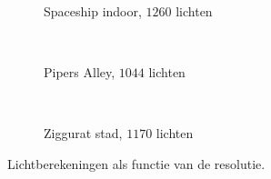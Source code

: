 \begin{figure}[t]
\begin{subfigure}[b]{\textwidth}
  \end{subfigure}\hfill\\
  \begin{minipage}[t]{0.5\textwidth}
  \begin{adjustbox}{minipage=\textwidth, scale=0.55}
    \begin{subfigure}[b]{1.6\textwidth}
      \centering
      \def\svgwidth{\textwidth}
      
      \caption{Spaceship indoor, $1260$ lichten}
      \vspace{4pt}
      \label{fig:ts-lc-resolution:indoor}
    \end{subfigure}
  \end{adjustbox} \\
  \begin{adjustbox}{minipage=\textwidth, scale=0.55}
    \begin{subfigure}[b]{1.6\textwidth}
      \centering
      \def\svgwidth{\textwidth}
      
      \caption{Pipers Alley, $1044$ lichten}
      \vspace{4pt}
      \label{fig:ts-lc-resolution:alley}
    \end{subfigure}
  \end{adjustbox} \\
  \begin{adjustbox}{minipage=\textwidth, scale=0.55}
    \begin{subfigure}[b]{1.6\textwidth}
      \centering
      \def\svgwidth{\textwidth}
      
      \caption{Ziggurat stad, $1170$ lichten}
      \label{fig:ts-lc-resolution:city}
    \end{subfigure}
  \end{adjustbox}
  \caption{\small Lichtberekeningen als functie van de resolutie. }
  \label{fig:ts-lc-resolution}
  \end{minipage}
  \begin{minipage}[t]{0.5\textwidth}
  \begin{adjustbox}{minipage=\textwidth, scale=0.55}

\end{adjustbox}
\end{minipage}
\end{figure}
